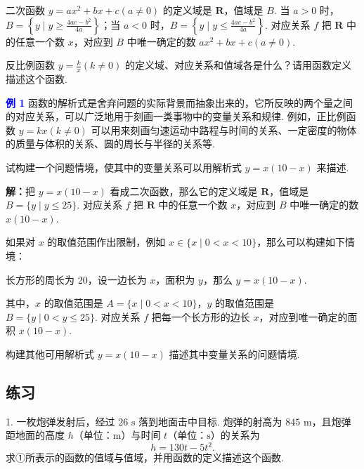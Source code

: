 \documentclass[a4paper,11pt]{ctexart}
\begin{document}
	二次函数 \(y = ax^2 + bx + c (a \neq 0)\) 的定义域是 \(\mathbf{R}\)，值域是 \(B\). 当 \(a > 0\) 时，\(B = \left\{y \mid y \geqslant \frac{4ac - b^2}{4a}\right\}\)；当 \(a < 0\) 时，\(B = \left\{y \mid y \leqslant \frac{4ac - b^2}{4a}\right\}\). 对应关系 \(f\) 把 \(\mathbf{R}\) 中的任意一个数 \(x\)，对应到 \(B\) 中唯一确定的数 \(ax^2 + bx + c (a \neq 0)\).
	
	\begin{thinkbox}[思考]
		反比例函数 \(y = \frac{k}{x} (k \neq 0)\) 的定义域、对应关系和值域各是什么？请用函数定义描述这个函数.
	\end{thinkbox}
	
	\textcolor{blue}{\textbf{例 1}} 函数的解析式是舍弃问题的实际背景而抽象出来的，它所反映的两个量之间的对应关系，可以广泛地用于刻画一类事物中的变量关系和规律. 例如，正比例函数 \(y = kx (k \neq 0)\) 可以用来刻画匀速运动中路程与时间的关系、一定密度的物体的质量与体积的关系、圆的周长与半径的关系等.
	
	试构建一个问题情境，使其中的变量关系可以用解析式 \(y = x(10 - x)\) 来描述.
	
	\textbf{解：}把 \(y = x(10 - x)\) 看成二次函数，那么它的定义域是 \(\mathbf{R}\)，值域是 \(B = \{y \mid y \leqslant 25\}\). 对应关系 \(f\) 把 \(\mathbf{R}\) 中的任意一个数 \(x\)，对应到 \(B\) 中唯一确定的数 \(x(10 - x)\).
	
	如果对 \(x\) 的取值范围作出限制，例如 \(x \in \{x \mid 0 < x < 10\}\)，那么可以构建如下情境：
	
	长方形的周长为 20，设一边长为 \(x\)，面积为 \(y\)，那么 \(y = x(10 - x)\).
	
	其中，\(x\) 的取值范围是 \(A = \{x \mid 0 < x < 10\}\)，\(y\) 的取值范围是 \(B = \{y \mid 0 < y \leqslant 25\}\). 对应关系 \(f\) 把每一个长方形的边长 \(x\)，对应到唯一确定的面积 \(x(10 - x)\).
	
	\begin{summarybox}[探究]
		构建其他可用解析式 \(y = x(10 - x)\) 描述其中变量关系的问题情境.
	\end{summarybox}
	
	
	
	\subsection*{练习}
	1. 一枚炮弹发射后，经过 \(26\text{ s}\) 落到地面击中目标. 炮弹的射高为 \(845\text{ m}\)，且炮弹距地面的高度 \(h\)（单位：\(\text{m}\)）与时间 \(t\)（单位：\(\text{s}\)）的关系为
	\begin{equation}
		h = 130t - 5t^2. \tag{①}
	\end{equation}
	求①所表示的函数的值域与值域，并用函数的定义描述这个函数.
	
\end{document}
